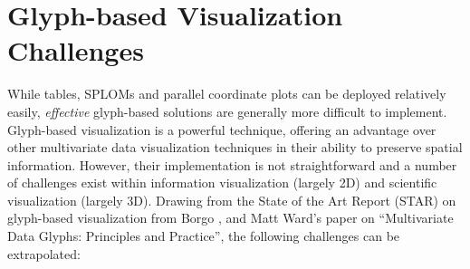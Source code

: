 \section{Glyph-based Visualization Challenges}
While tables, SPLOMs and parallel coordinate plots can be deployed relatively easily, \emph{effective} glyph-based solutions are generally more difficult to implement.
Glyph-based visualization is a powerful technique, offering an advantage over other multivariate data visualization techniques in their ability to preserve spatial information.
However, their implementation is not straightforward and a number of challenges exist within information visualization (largely 2D) and scientific visualization (largely 3D).
Drawing from the State of the Art Report (STAR) on glyph-based visualization from Borgo \etal \cite{Borgo:2013:EG}, and Matt Ward's paper on ``Multivariate Data Glyphs: Principles and Practice'', the following challenges can be extrapolated:


